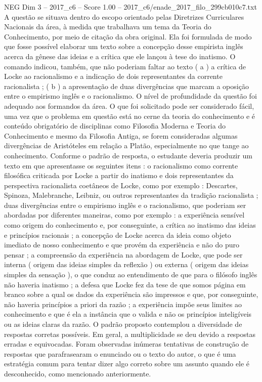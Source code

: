 \begin{textsample}{NEG Dim 3 – 2017\_c6 – Score 1.00 – 2017\_c6/enade\_2017\_filo\_299cb010c7.txt}
A questão se situava dentro do escopo orientado pelas Diretrizes Curriculares Nacionais da área, à medida que trabalhava um tema da Teoria do Conhecimento, por meio de citação da obra original.
Ela foi formulada de modo que fosse possível elaborar um texto sobre a concepção desse empirista inglês acerca da gênese das ideias e a crítica que ele lançou à tese do inatismo.
O comando indicou, também, que não poderiam faltar ao texto ( a ) a crítica de Locke ao racionalismo e a indicação de dois representantes da corrente racionalista ; ( b ) a apresentação de duas divergências que marcam a oposição entre o empirismo inglês e o racionalismo.
O nível de profundidade da questão foi adequado aos formandos da área.
O que foi solicitado pode ser considerado fácil, uma vez que o problema em questão está no cerne da teoria do conhecimento e é conteúdo obrigatório de disciplinas como Filosofia Moderna e Teoria do Conhecimento e mesmo da Filosofia Antiga, se forem consideradas algumas divergências de Aristóteles em relação a Platão, especialmente no que tange ao conhecimento.
Conforme o padrão de resposta, o estudante deveria produzir um texto em que apresentasse os seguintes itens : o racionalismo como corrente filosófica criticada por Locke a partir do inatismo e dois representantes da perspectiva racionalista coetâneos de Locke, como por exemplo : Descartes, Spinoza, Malebranche, Leibniz, ou outros representantes da tradição racionalista ; duas divergências entre o empirismo inglês e o racionalismo, que poderiam ser abordadas por diferentes maneiras, como por exemplo : a experiência sensível como origem do conhecimento e, por conseguinte, a crítica ao inatismo das ideias e princípios racionais ; a concepção de Locke acerca da ideia como objeto imediato de nosso conhecimento e que provém da experiência e não do puro pensar ; a compreensão da experiência na abordagem de Locke, que pode ser interna ( origem das ideias simples da reflexão ) ou externa ( origem das ideias simples da sensação ), o que conduz ao entendimento de que para o filósofo inglês não haveria inatismo ; a defesa que Locke fez da tese de que somos página em branco sobre a qual os dados da experiência são impressos e que, por conseguinte, não haveria princípios a priori da razão ; a experiência impõe seus limites ao conhecimento e que é ela a instância que o valida e não os princípios inteligíveis ou as ideias claras da razão.
O padrão proposto contemplou a diversidade de respostas corretas possíveis.
Em geral, a multiplicidade se deu devido a respostas erradas e equivocadas.
Foram observadas inúmeras tentativas de construção de respostas que parafrasearam o enunciado ou o texto do autor, o que é uma estratégia comum para tentar dizer algo correto sobre um assunto quando ele é desconhecido, como mencionado anteriormente.

\end{textsample}

